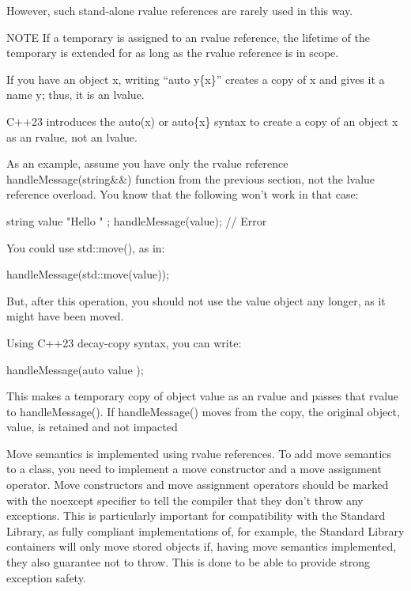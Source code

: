 However, such stand-alone rvalue references are rarely used in this way.

\begin{myNotic}{NOTE}
If a temporary is assigned to an rvalue reference, the lifetime of the temporary is extended for as long as the rvalue reference is in scope.
\end{myNotic}



If you have an object x, writing “auto y\{x\}” creates a copy of x and gives it a name y; thus, it is an lvalue.

C++23 introduces the auto(x) or auto\{x\} syntax to create a copy of an object x as an rvalue, not an lvalue.

As an example, assume you have only the rvalue reference handleMessage(string\&\&) function from the previous section, not the lvalue reference overload. You know that the following won’t work in that case:

\begin{cpp}
string value { "Hello " };
handleMessage(value); // Error
\end{cpp}

You could use std::move(), as in:

\begin{cpp}
handleMessage(std::move(value));
\end{cpp}

But, after this operation, you should not use the value object any longer, as it might have been moved.

Using C++23 decay-copy syntax, you can write:

\begin{cpp}
handleMessage(auto { value });
\end{cpp}

This makes a temporary copy of object value as an rvalue and passes that rvalue to handleMessage(). If handleMessage() moves from the copy, the original object, value, is retained and not impacted


Move semantics is implemented using rvalue references. To add move semantics to a class, you need to implement a move constructor and a move assignment operator. Move constructors and move assignment operators should be marked with the noexcept specifier to tell the compiler that they don’t throw any exceptions. This is particularly important for compatibility with the Standard Library, as fully compliant implementations of, for example, the Standard Library containers will only move stored objects if, having move semantics implemented, they also guarantee not to throw. This is done to be able to provide strong exception safety.


